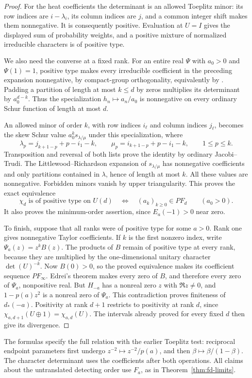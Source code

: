 \begin{proof}
For the heat coefficients the determinant is an allowed Toeplitz
minor: its row indices are \(i-\lambda_i\), its column indices
are \(j\), and a common integer shift makes them nonnegative.
It is consequently positive. Evaluation at \(U=I\) gives the
displayed sum of probability weights, and a positive mixture
of normalized irreducible characters is of positive type.

We also need the converse at a fixed rank. For an entire real
\(\Psi\) with \(a_0>0\) and \(\Psi(1)=1\), positive type makes
every irreducible coefficient in the preceding expansion
nonnegative, by compact-group orthogonality, equivalently by
\cite[Section~4.1, p.~56]{Faraut2007}. Padding a partition
of length at most \(k\le d\) by zeros multiplies its determinant
by \(a_0^{d-k}\). Thus the specialization \(h_n\mapsto a_n/a_0\)
is nonnegative on every ordinary Schur function of length at most
\(d\).

An allowed minor of order \(k\), with row indices \(i_\ell\)
and column indices \(j_\ell\), becomes the skew Schur value
\(a_0^k s_{\lambda/\mu}\) under this specialization, where
\[
 \lambda_p=j_{k+1-p}+p-i_1-k,\qquad
 \mu_p=i_{k+1-p}+p-i_1-k,\qquad 1\le p\le k.
\]
Transposition and reversal of both lists prove the identity by
ordinary Jacobi--Trudi. The Littlewood--Richardson expansion
of \(s_{\lambda/\mu}\) has nonnegative coefficients and only
partitions contained in \(\lambda\), hence of length at most \(k\).
All these values are nonnegative. Forbidden minors vanish by
upper triangularity. This proves the exact equivalence
\[
 \chi_d\text{ is of positive type on }U(d)
 \quad\Longleftrightarrow\quad (a_k)_{k\ge0}\in PF_d
 \qquad(a_0>0).
\]
It also proves the minimum-order assertion, since \(E_a(-1)>0\)
near zero.

To finish, suppose that all ranks were of positive type for
some \(a>0\). Rank one gives nonnegative Taylor coefficients.
If \(k\) is the first nonzero index, write \(\Psi_a(z)=z^k B(z)\).
The products of \(B\) remain of positive type at every rank,
because they are multiplied by the one-dimensional unitary
character \(\det(U)^{-k}\). Now \(B(0)>0\), so the proved
equivalence makes its coefficient sequence \(PF_\infty\).
Edrei's theorem makes every zero of \(B\), and therefore every
zero of \(\Psi_a\), nonpositive real. But \(H_{-a}\) has a
nonreal zero \(z\) with \(\Re z\ne0\), and
\(1-p(a)z^2\) is a nonreal zero of \(\Psi_a\). This contradiction
proves finiteness of \(d_*(-a)\). Positivity at rank \(d+1\)
restricts to positivity at rank \(d\), since
\(\chi_{a,d+1}(U\oplus1)=\chi_{a,d}(U)\). The intervals already
proved for every fixed \(d\) then give its divergence.
\end{proof}

The formulas specify the full relation with the earlier Toeplitz
test: reciprocal endpoint parameters first undergo
\(z^{-2}\mapsto z^{-2}/p(a)\), and then
\(\beta\mapsto\beta/(1-\beta)\). The character determinant uses
the coefficients after both operations. All claims about the
untranslated detecting order use \(F_a\), as in
Theorem~\ref{thm:fd-limits}.
